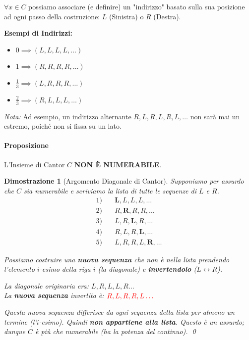 \documentclass[openany]{book}
\newtheorem*{dimostrazione}{Dimostrazione}
\theoremstyle{definition}
\theoremstyle{remark}
\begin{document}
$\forall x \in C$ possiamo associare (e definire) un "indirizzo" basato sulla sua posizione ad ogni passo della costruzione: $L$ (Sinistra) o $R$ (Destra).

\textbf{Esempi di Indirizzi:}
\begin{itemize}
    \item $0 \implies (L, L, L, L, \dots)$
    \item $1 \implies (R, R, R, R, \dots)$
    \item $\frac{1}{3} \implies (L, R, R, R, \dots)$
    \item $\frac{2}{3} \implies (R, L, L, L, \dots)$
\end{itemize}
\textit{Nota:} Ad esempio, un indirizzo alternante $R, L, R, L, R, L, \dots$ non sarà mai un estremo, poiché non si fissa su un lato.

\vspace{1em}
\paragraph{Proposizione}
L'Insieme di Cantor $C$ \textbf{NON È NUMERABILE}.


\begin{dimostrazione}[Argomento Diagonale di Cantor]
Supponiamo per assurdo che $C$ sia numerabile e scriviamo la lista di tutte le sequenze di $L$ e $R$.
\begin{align*}
    1) \quad & \mathbf{L}, L, L, L, \dots \\
    2) \quad & R, \mathbf{R}, R, R, \dots \\
    3) \quad & L, R, \mathbf{L}, R, \dots \\
    4) \quad & R, L, R, \mathbf{L}, \dots \\
    5) \quad & L, R, R, L, \mathbf{R}, \dots
\end{align*}

Possiamo costruire una \textbf{nuova sequenza} che non è nella lista prendendo l'elemento $i$-esimo della riga $i$ (la diagonale) e \textbf{invertendolo} ($L \leftrightarrow R$).

La diagonale originaria era: $L, R, L, L, R \dots$ \\
La \textbf{nuova sequenza} invertita è: $\color{red} R, L, R, R, L \dots$

Questa nuova sequenza differisce da \emph{ogni} sequenza della lista per \emph{almeno} un termine (l'$i$-esimo). Quindi \textbf{non appartiene alla lista}. Questo è un assurdo; dunque $C$ è più che numerabile (ha la potenza del continuo). \qed
\end{dimostrazione}
\end{document}
